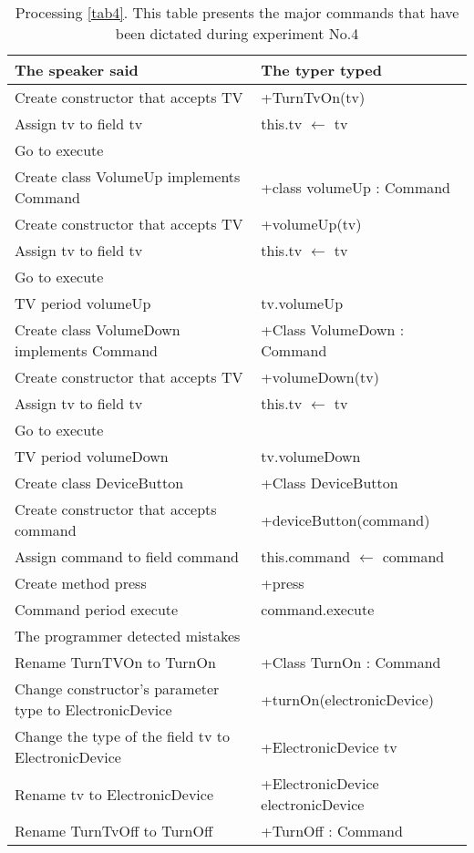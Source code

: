 \begin{table}[H]
	\begin{tabular}{|p{10cm}|p{6cm}|}
		\hline
		\rowcolor[HTML]{9B9B9B} 
		{\color[HTML]{000000} The speaker said} & {\color[HTML]{000000} The typer typed} \\ \hline
		Create constructor that accepts TV & +TurnTvOn(tv) \\ \hline
		Assign tv to field tv & this.tv $\leftarrow$ tv \\ \hline
		Go to execute & \\ \hline
		Create class VolumeUp implements Command & +class volumeUp : Command \\ \hline
		Create constructor that accepts TV & +volumeUp(tv) \\ \hline
		Assign tv to field tv & this.tv $\leftarrow$ tv \\ \hline
		Go to execute & \\ \hline
		TV period volumeUp & tv.volumeUp \\ \hline
		Create class VolumeDown implements Command & +Class VolumeDown : Command \\ \hline
		Create constructor that accepts TV & +volumeDown(tv) \\ \hline
		Assign tv to field tv & this.tv $\leftarrow$ tv \\ \hline
		Go to execute & \\ \hline
		TV period volumeDown & tv.volumeDown \\ \hline
		Create class DeviceButton & +Class DeviceButton \\ \hline
		Create constructor that accepts command & +deviceButton(command) \\ \hline
		Assign command to field command & this.command $\leftarrow$ command \\ \hline
		Create method press & +press \\ \hline
		Command period execute & command.execute \\ \hline
		\rowcolor[HTML]{9B9B9B}The programmer detected mistakes &  \\ \hline
		Rename TurnTVOn to TurnOn & +Class TurnOn : Command \\ \hline
		Change constructor's parameter type to ElectronicDevice & +turnOn(electronicDevice) \\ \hline
		Change the type of the field tv to ElectronicDevice & +ElectronicDevice tv \\ \hline
		Rename tv to ElectronicDevice & +ElectronicDevice electronicDevice \\ \hline
		Rename TurnTvOff to TurnOff & +TurnOff : Command \\ \hline
	\end{tabular}
	\caption{Processing \autoref{tab4}. This table presents the major commands that have been dictated during experiment No.4}
	\label{tab5}
\end{table}
